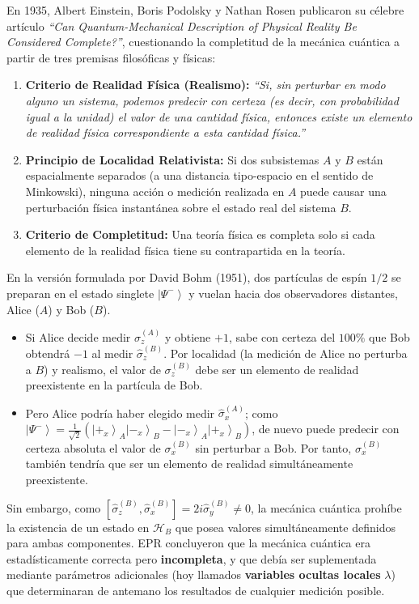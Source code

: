 \documentclass[11pt,a4paper,twoside]{report}
\theoremstyle{definition}
\theoremstyle{plain}
\theoremstyle{remark}
\newcommand{\ket}[1]{\left| #1 \right\rangle}
\newcommand{\comm}[2]{\left[ #1, #2 \right]}
\newcommand{\Hil}{\mathcal{H}}
\newcommand{\op}[1]{\hat{#1}}
\begin{document}
En 1935, Albert Einstein, Boris Podolsky y Nathan Rosen publicaron su célebre artículo \textit{``Can Quantum-Mechanical Description of Physical Reality Be Considered Complete?''}, cuestionando la completitud de la mecánica cuántica a partir de tres premisas filosóficas y físicas:
\begin{enumerate}[label=\textbf{P\arabic*.}]
    \item \textbf{Criterio de Realidad Física (Realismo):} \textit{``Si, sin perturbar en modo alguno un sistema, podemos predecir con certeza (es decir, con probabilidad igual a la unidad) el valor de una cantidad física, entonces existe un elemento de realidad física correspondiente a esta cantidad física.''}
    \item \textbf{Principio de Localidad Relativista:} Si dos subsistemas $A$ y $B$ están espacialmente separados (a una distancia tipo-espacio en el sentido de Minkowski), ninguna acción o medición realizada en $A$ puede causar una perturbación física instantánea sobre el estado real del sistema $B$.
    \item \textbf{Criterio de Completitud:} Una teoría física es completa solo si cada elemento de la realidad física tiene su contrapartida en la teoría.
\end{enumerate}

En la versión formulada por David Bohm (1951), dos partículas de espín $1/2$ se preparan en el estado singlete $\ket{\Psi^-}$ y vuelan hacia dos observadores distantes, Alice ($A$) y Bob ($B$).
\begin{itemize}
    \item Si Alice decide medir $\op{\sigma}_z^{(A)}$ y obtiene $+1$, sabe con certeza del $100\%$ que Bob obtendrá $-1$ al medir $\op{\sigma}_z^{(B)}$. Por localidad (la medición de Alice no perturba a $B$) y realismo, el valor de $\sigma_z^{(B)}$ debe ser un elemento de realidad preexistente en la partícula de Bob.
    \item Pero Alice podría haber elegido medir $\op{\sigma}_x^{(A)}$; como $\ket{\Psi^-} = \frac{1}{\sqrt{2}}(\ket{+_x}_A\ket{-_x}_B - \ket{-_x}_A\ket{+_x}_B)$, de nuevo puede predecir con certeza absoluta el valor de $\sigma_x^{(B)}$ sin perturbar a Bob. Por tanto, $\sigma_x^{(B)}$ también tendría que ser un elemento de realidad simultáneamente preexistente.
\end{itemize}
Sin embargo, como $\comm{\op{\sigma}_z^{(B)}}{\op{\sigma}_x^{(B)}} = 2i\op{\sigma}_y^{(B)} \neq 0$, la mecánica cuántica prohíbe la existencia de un estado en $\Hil_B$ que posea valores simultáneamente definidos para ambas componentes. EPR concluyeron que la mecánica cuántica era estadísticamente correcta pero \textbf{incompleta}, y que debía ser suplementada mediante parámetros adicionales (hoy llamados \textbf{variables ocultas locales} $\lambda$) que determinaran de antemano los resultados de cualquier medición posible.
\end{document}

